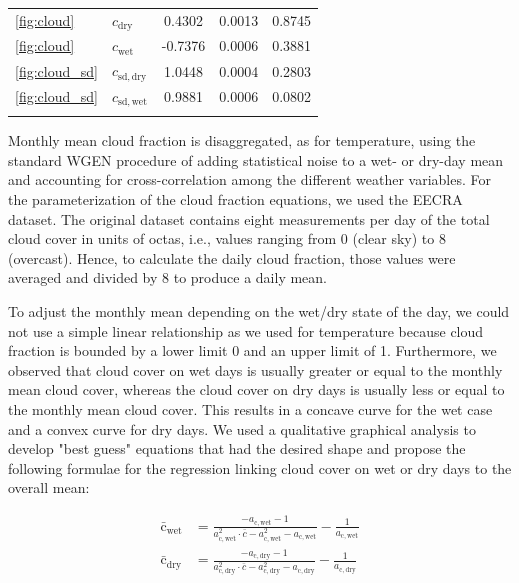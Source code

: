 \begin{refsection}
\begin{table}[t]
\begin{tabular}{llccc}
		\middlehline
		\ref{fig:cloud} &  $c_{\mathrm{dry}}$ & 0.4302 & 0.0013 & 0.8745 \\
		\ref{fig:cloud} &  $c_{\mathrm{wet}}$ & -0.7376 & 0.0006 & 0.3881 \\
		\ref{fig:cloud_sd} &  $c_{\mathrm{sd}, \mathrm{dry}}$ & 1.0448 & 0.0004 & 0.2803 \\
		\ref{fig:cloud_sd} &  $c_{\mathrm{sd}, \mathrm{wet}}$ & 0.9881 & 0.0006 & 0.0802 \\
		\bottomhline
	\end{tabular}
\end{table}

Monthly mean cloud fraction is disaggregated, as for temperature, using the standard WGEN procedure of adding statistical noise to a wet- or dry-day mean and accounting for cross-correlation among the different weather variables. For the parameterization of the cloud fraction equations, we used the EECRA dataset. The original dataset contains eight measurements per day of the total cloud cover in units of octas, i.e., values ranging from 0 (clear sky) to 8 (overcast). Hence, to calculate the daily cloud fraction, those values were averaged and divided by 8 to produce a daily mean.

To adjust the monthly mean depending on the wet/dry state of the day, we could not use a simple linear relationship as we used for temperature because cloud fraction is bounded by a lower limit 0 and an upper limit of 1. Furthermore, we observed that cloud cover on wet days is usually greater or equal to the monthly mean cloud cover, whereas the cloud cover on dry days is usually less or equal to the monthly mean cloud cover. This results in a concave curve for the wet case and a convex curve for dry days. We used a qualitative graphical analysis to develop "best guess" equations that had the desired shape and propose the following formulae for the regression linking cloud cover on wet or dry days to the overall mean:

\begin{align}
\bar{\mathrm{c}}_\mathrm{wet} &= \frac{-a_{\mathrm{c}, \mathrm{wet}} - 1}{a_{\mathrm{c}, \mathrm{wet}}^2 \cdot \bar{c} - a_{\mathrm{c}, \mathrm{wet}}^2 - a_{\mathrm{c}, \mathrm{wet}}}  - \frac{1}{a_{\mathrm{c}, \mathrm{wet}}} \nonumber \\
\bar{\mathrm{c}}_\mathrm{dry} &= \frac{-a_{\mathrm{c}, \mathrm{dry}} - 1}{a_{\mathrm{c}, \mathrm{dry}}^2 \cdot \bar{c} - a_{\mathrm{c}, \mathrm{dry}}^2 - a_{\mathrm{c}, \mathrm{dry}}}  - \frac{1}{a_{\mathrm{c}, \mathrm{dry}}}
\label{eq:cloud_mean}
\end{align}


\end{refsection}
